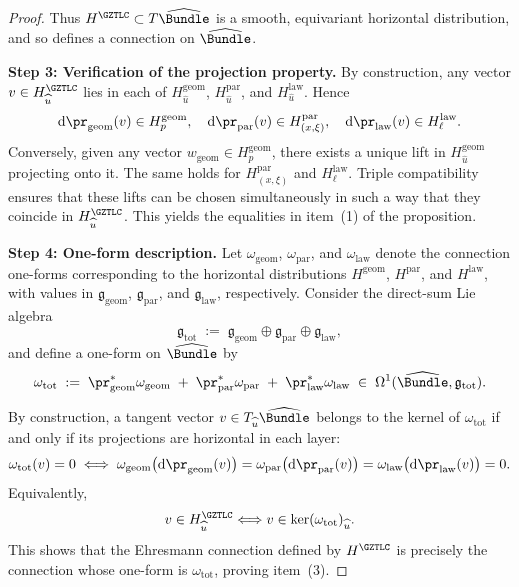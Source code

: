\documentclass[11pt]{book}
\theoremstyle{plain}
\theoremstyle{definition}
\begin{document}
\begin{proof}
Thus \(H^{\GZTLC}\subset T\widehat{\Bundle}\) is a smooth,
equivariant horizontal distribution, and so defines a connection on
\(\widehat{\Bundle}\).



\medskip\noindent
\textbf{Step 3: Verification of the projection property.}
By construction, any vector
 \(v\in H^{\GZTLC}_{\widehat{u}}\) lies in each of
 \(H_{\widehat{u}}^{\mathrm{geom}}\),
 \(H_{\widehat{u}}^{\mathrm{par}}\), and
 \(H_{\widehat{u}}^{\mathrm{law}}\).  Hence
\[
  \mathrm{d}\pr_{\mathrm{geom}}(v)\in H^{\mathrm{geom}}_p,\quad
  \mathrm{d}\pr_{\mathrm{par}}(v)\in H^{\mathrm{par}}_{(x,\xi)},\quad
  \mathrm{d}\pr_{\mathrm{law}}(v)\in H^{\mathrm{law}}_{\ell}.
\]
Conversely, given any vector
\(w_{\mathrm{geom}}\in H^{\mathrm{geom}}_p\), there exists a unique
lift in \(H_{\widehat{u}}^{\mathrm{geom}}\) projecting onto it.  The
same holds for \(H^{\mathrm{par}}_{(x,\xi)}\) and
 \(H^{\mathrm{law}}_{\ell}\).  Triple compatibility ensures that these
lifts can be chosen simultaneously in such a way that they coincide in
 \(H^{\GZTLC}_{\widehat{u}}\).  This yields the equalities in item~(1)
of the proposition.



\medskip\noindent
\textbf{Step 4: One-form description.}
Let \(\omega_{\mathrm{geom}}\),
\(\omega_{\mathrm{par}}\), and \(\omega_{\mathrm{law}}\) denote the
connection one-forms corresponding to the horizontal distributions
\(H^{\mathrm{geom}}\), \(H^{\mathrm{par}}\), and \(H^{\mathrm{law}}\),
with values in \(\mathfrak{g}_{\mathrm{geom}}\),
\(\mathfrak{g}_{\mathrm{par}}\), and \(\mathfrak{g}_{\mathrm{law}}\),
respectively.  Consider the direct-sum Lie algebra
\[
  \mathfrak{g}_{\mathrm{tot}}
  \;:=\;
  \mathfrak{g}_{\mathrm{geom}}
  \oplus
  \mathfrak{g}_{\mathrm{par}}
  \oplus
  \mathfrak{g}_{\mathrm{law}},
\]
and define a one-form on \(\widehat{\Bundle}\) by
\[
  \omega_{\mathrm{tot}}
  \;:=\;
  \pr_{\mathrm{geom}}^*\omega_{\mathrm{geom}}
  \;+\;
  \pr_{\mathrm{par}}^*\omega_{\mathrm{par}}
  \;+\;
  \pr_{\mathrm{law}}^*\omega_{\mathrm{law}}
  \;\in\;
  \Omega^1(\widehat{\Bundle},\mathfrak{g}_{\mathrm{tot}}).
\]

By construction, a tangent vector \(v\in T_{\widehat{u}}\widehat{\Bundle}\)
belongs to the kernel of \(\omega_{\mathrm{tot}}\) if and only if its
projections are horizontal in each layer:
\[
  \omega_{\mathrm{tot}}(v)=0
  \;\Longleftrightarrow\;
  \omega_{\mathrm{geom}}\bigl(\mathrm{d}\pr_{\mathrm{geom}}(v)\bigr)
  =
  \omega_{\mathrm{par}}\bigl(\mathrm{d}\pr_{\mathrm{par}}(v)\bigr)
  =
  \omega_{\mathrm{law}}\bigl(\mathrm{d}\pr_{\mathrm{law}}(v)\bigr)
  = 0.
\]
Equivalently,
\[
  v\in H_{\widehat{u}}^{\GZTLC}
  \Longleftrightarrow
  v\in \ker(\omega_{\mathrm{tot}})_{\widehat{u}}.
\]
This shows that the Ehresmann connection defined by
 \(H^{\GZTLC}\) is precisely the connection whose one-form is
 \(\omega_{\mathrm{tot}}\), proving item~(3).




\end{proof}
\end{document}
